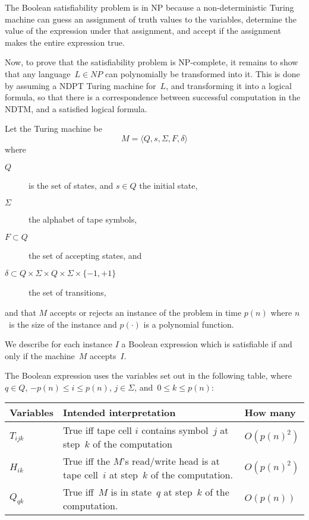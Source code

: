 \begin{comment}
There are several normal forms of this problem. The one used here is
the conjunction (by~AND) of clauses of the form $u_i\vee v_i$, where
$u_i,v_i$ are $x_j$ or~$\neq x_j$ for some values of~$j$.
\end{comment}

The Boolean satisfiability problem is in NP because a
non-deterministic Turing machine can guess an assignment of truth
values to the variables, determine the value of the expression under
that assignment, and accept if the assignment makes the entire
expression true.

Now, to prove that the satisfiability problem is NP-complete, it remains
to show that any language~$L\in NP$ can polynomially be transformed into
it. This is done by assuming a NDPT Turing machine for~$L$, and
transforming it into a logical formula, so that there is a
correspondence between successful computation in the NDTM, and a
satisfied logical formula.

Let the Turing machine be
\[ M = \langle Q, s, \Sigma, F, \delta\rangle
\]
where
\begin{description}
\item[$Q$] is the set of states, and $s\in Q$ the initial
       state,
\item[$\Sigma$] the alphabet of
     tape symbols,
\item[$F\subset Q$] the set of accepting states, and
\item[$\delta\subset Q\times\Sigma\times Q\times\Sigma\times\{-1,+1\}$] the
  set of transitions,
\end{description}
and that $M$ accepts or rejects an instance of the problem in time
$p(n)$ where $n$~is the size of the instance and $p(\cdot)$ is a
polynomial function.

We describe for each instance $I$ a Boolean expression which is
satisfiable if and only if the machine~$M$ accepts~$I$.

The Boolean expression uses the variables set out in the following
table, where $q\in Q$, $-p(n)\leq i\leq p(n)$, $j\in\Sigma$,
and~$0\leq k\leq p(n)$:

\begin{tabular}{|lp{2in}l|}
\hline
Variables&
Intended interpretation&
How many\\
\hline
$T_{ijk}$&
True iff tape cell $i$ contains symbol~$j$ at step~$k$ of the computation&
$O(p(n)^2)$\\
$H_{ik}$&
True iff the $M$'s read/write head is at tape cell~$i$ at step~$k$ of the computation.&
$O(p(n)^2)$\\
$Q_{qk}$&
True iff~$M$ is in state~$q$ at step~$k$ of the computation.&
$O(p(n))$\\
\hline
\end{tabular}


